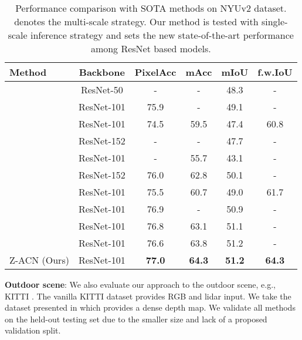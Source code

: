\documentclass[lettersize,journal]{IEEEtran}
\begin{document}
\begin{table}[t]
\caption{Performance comparison with SOTA methods on NYUv2 dataset.  denotes the multi-scale strategy. Our method is tested with single-scale inference strategy and sets the new state-of-the-art performance among ResNet based models.}
\label{tab:nyu}
\centering
\setlength\tabcolsep{1pt}
\setlength\extrarowheight{0pt}
\begin{tabular}[ht]{l c c c c c }
\hline

\hline

\hline

\hline
 Method  & Backbone & PixelAcc & mAcc & mIoU & f.w.IoU \\
\hline
 \cite{hu2019acnet}  &ResNet-50 & - & - & 48.3 & - \\
 \cite{xing20192}  &ResNet-101& 75.9 & - & 49.1 & - \\
 \cite{cao2021shapeconv} &ResNet-101 & 74.5 & 59.5 & 47.4 & 60.8 \\
\hline

\hline

\hline


 \cite{Lin2017RGBDCascaded}  &ResNet-152 & - & - & 47.7 & - \\
 \cite{qi20173d} &ResNet-101 & - & 55.7 & 43.1 & - \\
 \cite{park2017rdfnet} &ResNet-152 & 76.0 & 62.8 & 50.1 & - \\
 \cite{cao2021shapeconv} &ResNet-101 & 75.5 & 60.7 & 49.0 & 61.7 \\
 \cite{xing2020malleable}  &ResNet-101 & 76.9 & - & 50.9 & - \\
 \cite{chen2021spatial}  &ResNet-101 & 76.8 & 63.1 & 51.1 & - \\
 \cite{zhou2020canet} &ResNet-101 & 76.6 & 63.8 & 51.2 & - \\
\hline

\hline

\hline
Z-ACN (Ours)  &ResNet-101 & \textbf{77.0} & \textbf{64.3} & \textbf{51.2} & \textbf{64.3} \\
\hline

\hline

\hline

\hline
\end{tabular}
\end{table}




\textbf{Outdoor scene}:
\label{outdoor}
We also evaluate our approach to the outdoor scene, e.g., KITTI \cite{kitti}. The vanilla KITTI dataset provides RGB and lidar input. We take the dataset presented in \cite{xu:kitti} which provides a dense depth map. We validate all methods on the held-out testing set due to the smaller size and lack of a proposed validation split.
\end{document}
